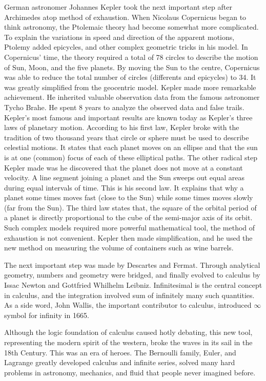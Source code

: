 \documentclass{article}
\begin{document}
German astronomer Johannes Kepler took the next important step after Archimedes atop method of exhaustion. When Nicolaus Copernicus began to think astronomy, the Ptolemaic theory had become somewhat more complicated. To explain the variations in speed and direction of the apparent motions, Ptolemy added epicycles, and other complex geometric tricks in his model. In Copernicus' time, the theory required a total of 78 circles to describe the motion of Sun, Moon, and the five planets. By moving the Sun to the centre, Copernicus was able to reduce the total number of circles (differents and epicycles) to 34. It was greatly simplified from the geocentric model. Kepler made more remarkable achievement. He inherited valuable observation data from the famous astronomer Tycho Brahe. He spent 8 years to analyze the observed data and false trails. Kepler's most famous and important results are known today as Kepler's three laws of planetary motion. According to his first law, Kepler broke with the tradition of two thousand years that circle or sphere must be used to describe celestial motions. It states that each planet moves on an ellipse and that the sun is at one (common) focus of each of these elliptical paths. The other radical step Kepler made was he discovered that the planet does not move at a constant velocity. A line segment joining a planet and the Sun sweeps out equal areas during equal intervals of time. This is his second law. It explains that why a planet some times moves fast (close to the Sun) while some times moves slowly (far from the Sun). The third law states that, the square of the orbital period of a planet is directly proportional to the cube of the semi-major axis of its orbit. Such complex models required more powerful mathematical tool, the method of exhaustion is not convenient. Kepler then made simplification, and he used the new method on measuring the volume of containers such as wine barrels.

The next important step was made by Descartes and Fermat. Through analytical geometry, numbers and geometry were bridged, and finally evolved to calculus by Issac Newton and Gottfried Whilhelm Leibniz. Infinitesimal is the central concept in calculus, and the integration involved sum of infinitely many such quantities. As a side word, John Wallis, the important contributor to calculus, introduced $\infty$ symbol for infinity in 1665.

Although the logic foundation of calculus caused hotly debating, this new tool, representing the modern spirit of the western, broke the waves in its sail in the 18th Century. This was an era of heroes. The Bernoulli family, Euler, and Lagrange greatly developed calculus and infinite series, solved many hard problems in astronomy, mechanics, and fluid that people never imagined before.
\end{document}
